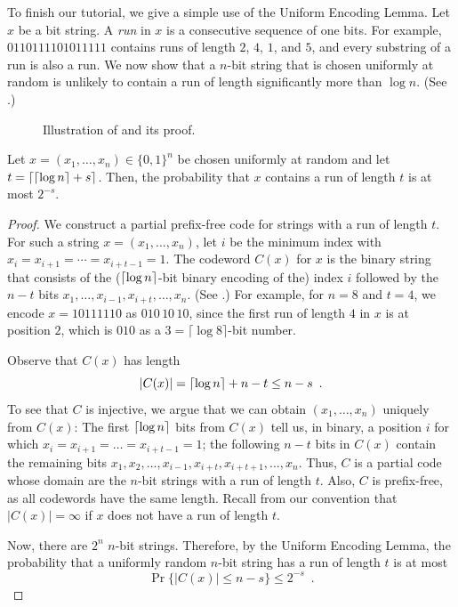 \documentclass[format=acmsmall, review=false, screen=true]{acmart}
\begin{document}
To finish our tutorial, we give a simple use of the 
Uniform Encoding Lemma. Let $x$ be a bit string. 
A \emph{run} in $x$ is a consecutive sequence of
one bits. For example,
$0110111101011111$ contains runs of length
$2$, $4$, $1$, and $5$,  and every substring
of a run is also a run. We now show that
a $n$-bit string that is
chosen uniformly at random is unlikely to contain
a run of length significantly more than $\log n$.  (See
.)

\begin{figure}
  \caption{Illustration of  and its proof.}
\end{figure}

\begin{thm}
  Let $x=(x_1,\ldots,x_n)\in\{0,1\}^n$ be chosen uniformly at random
  and let $t = {\left\lceil {\lceil \log n \rceil} + s \right\rceil}$. Then, the probability that
  $x$ contains a run of length $t$
  is at most $2^{-s}$.
\end{thm}

\begin{proof}
  We construct a partial prefix-free
  code for strings with a run of length $t$. For such a string 
  $x=(x_1,\ldots,x_n)$, let $i$ be the minimum index with
  $x_i=x_{i+1}=\cdots=x_{i+t-1}=1$. The codeword $C(x)$ for $x$ is the
  binary string that consists of the (${\lceil \log n \rceil}$-bit binary
  encoding of the) index $i$ followed by the $n-t$ bits
  $x_1,\dots,x_{i-1},x_{i+t},\dots,x_n$. (See .)
  For example, for $n = 8$ and $t = 4$, we encode
  $x = 10111110$ as $010\,10\,10$, since
  the first run of length $4$ in $x$ is at position $2$,
  which is $010$ as a $3 = \lceil \log 8 \rceil$-bit number.

  Observe that $C(x)$ has length 
  \[
    |C(x)| = {\lceil \log n \rceil} + n - t \le n-s \enspace .
  \]
  To see that $C$ is injective, 
  we argue that we can obtain $(x_1,\ldots,x_n)$ uniquely 
  from $C(x)$: 
  The first ${\lceil \log n \rceil}$
  bits from $C(x)$ tell us, in binary, a position $i$ for
  which $x_i = x_{i + 1} = \dots = x_{i + t - 1} = 1$; the following
  $n - t$ bits in $C(x)$ contain the remaining 
  bits
  $x_1, x_2, \dots, x_{i - 1}, x_{i + t}, x_{i + t + 1}, \dots,
  x_n$. Thus, $C$ is a partial code whose domain are the $n$-bit strings
  with a run of length $t$.  Also,
  $C$ is prefix-free, as all codewords have the same 
  length.
  Recall from our convention that $|C(x)| = \infty$ if
  $x$ does not have a run of length $t$.


  Now, there are $2^n$ $n$-bit strings.
  Therefore, by the Uniform Encoding Lemma, the probability that 
  a uniformly random $n$-bit string has a run of length $t$ 
  is at most
  \[
    \Pr\{|C(x)|\le n-s\} \le 2^{-s} \enspace . 
  \]
\end{proof}
\end{document}
